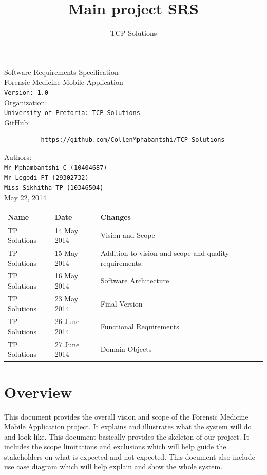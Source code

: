 \documentclass[10pt,a4paper]{article}
\author{TCP Solutions}
\title{Main project SRS}
\begin{document}
\begin{titlepage}
\begin{center}

\huge Software Requirements Specification\\[0.15cm]
\huge Forensic Medicine Mobile Application\\[0.15cm]
\large \texttt{Version: 1.0}\\[1cm]

Organization:\\
\texttt{University of Pretoria: TCP Solutions}\\[0.5cm]
GitHub:\\[0.01cm]

\begin{verbatim}
          https://github.com/CollenMphabantshi/TCP-Solutions
\end{verbatim}

Authors:\\
\texttt{Mr Mphambantshi C (10404687)\\
        Mr Legodi PT (29302732)\\
        Miss Sikhitha TP  (10346504)}\\[1cm]
        
May 22, 2014

\begin{tabular}{|l|l|l|}\hline
Name   & Date	& Changes	\\\hline
TP Solutions	& 14 May 2014	& Vision and Scope\\\hline
TP Solutions	& 15 May 2014	& Addition to vision and scope and quality requirements.\\\hline
TP Solutions	& 16 May 2014	& Software Architecture\\\hline
TP Solutions	& 23 May 2014	& Final Version\\\hline
TP Solutions	& 26 June 2014	& Functional Requirements\\\hline
TP Solutions	& 27 June 2014	& Domain Objects\\\hline
\end{tabular}

\end{center}
\end{titlepage}


\tableofcontents
\pagebreak
\section{Overview}
This document provides the overall vision and scope of the Forensic Medicine Mobile Application project. It explains and illustrates what the system will do and look like. This document basically provides the skeleton of our project. It includes the scope limitations and exclusions which will help guide the stakeholders on what is expected and not expected. This document also include use case diagram which will help explain and show the whole system.
\end{document}
